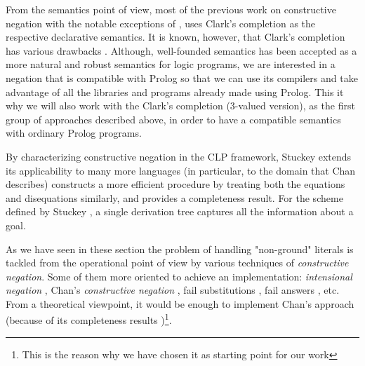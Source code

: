 \documentclass{tlp}
\begin{document}

From the semantics point of view, most of the previous work on
constructive negation with the notable exceptions of
\cite{Damasio,Przymusinski2}, uses Clark's completion as the
respective declarative semantics. It is known, however, that Clark's
completion has various drawbacks \cite{Przymusinski3}. Although,
well-founded semantics \cite{VGelder} has been accepted as a more
natural and robust semantics for logic programs, we are interested in
a negation that is compatible with Prolog so that we can use its
compilers and take advantage of all the libraries and programs already
made using Prolog. This it why we will also work with the Clark's
completion (3-valued version), as the first group of approaches
described above, in order to have a compatible semantics with ordinary
Prolog programs.







By characterizing constructive negation in the CLP framework,
Stuckey \cite{Stuckey95} extends its applicability to many more
languages (in particular, to the domain that Chan describes)
constructs a more efficient procedure by treating both the equations
and disequations similarly, and provides a completeness result. For
the scheme defined by Stuckey \cite{Stuckey95}, a single derivation
tree captures all the information about a goal.


As we have seen in these section the problem of handling "non-ground"
literals is tackled from the operational point of view by various
techniques of {\em constructive negation}. Some of them more oriented
to achieve an implementation: {\em intensional negation}
\cite{Barbuti1,Barbuti2}, Chan's {\em constructive negation}
\cite{Chan1,Chan2,Stuckey93}, fail substitutions \cite{Malus}, fail
answers \cite{Drabent}, etc. From a theoretical viewpoint, it would be
enough to implement Chan's approach (because of its completeness
results \cite{Stuckey93})\footnote{This is the reason why we have
chosen it as starting point for our work}. 

\end{document}
